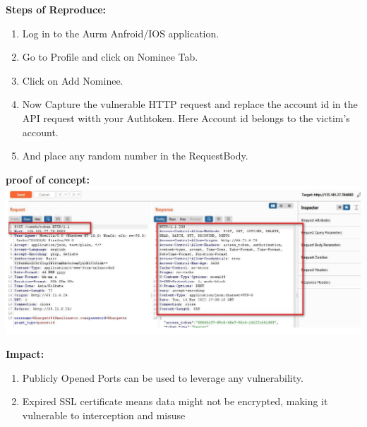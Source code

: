 \documentclass{article}
\begin{document}
\begin{description}[itemsep=2pt, leftmargin=0.2cm]
                    \item \large \textbf{Steps of Reproduce:}
                            \linespread{1.0}
                            \begin{enumerate}[leftmargin=0.5cm]
                             
                             \item \large Log in to the Aurm Anfroid/IOS application.

                             \item \large Go to Profile and click on Nominee Tab.

                             \item \large Click on Add Nominee.

                             \item \large Now Capture the vulnerable HTTP request and replace the account id in the API request witth your Authtoken. Here Account id belongs to the victim's account.

                             \item \large And place any random number in the RequestBody.
                             \end{enumerate}

                    \item \large \textbf{proof of concept: \\ \includegraphics[width=1.0\textwidth]{2.png}} 


                    

                    \item \large \textbf{Impact:}
                            \linespread{1.0}
                            \begin{enumerate}[leftmargin=0.5cm]
                             \item \large Publicly Opened Ports can be used to leverage any vulnerability.
\item \large Expired SSL certificate means data might not be encrypted, making it vulnerable to interception and misuse 
                            \end{enumerate}  
                            

\end{description}
\end{document}
